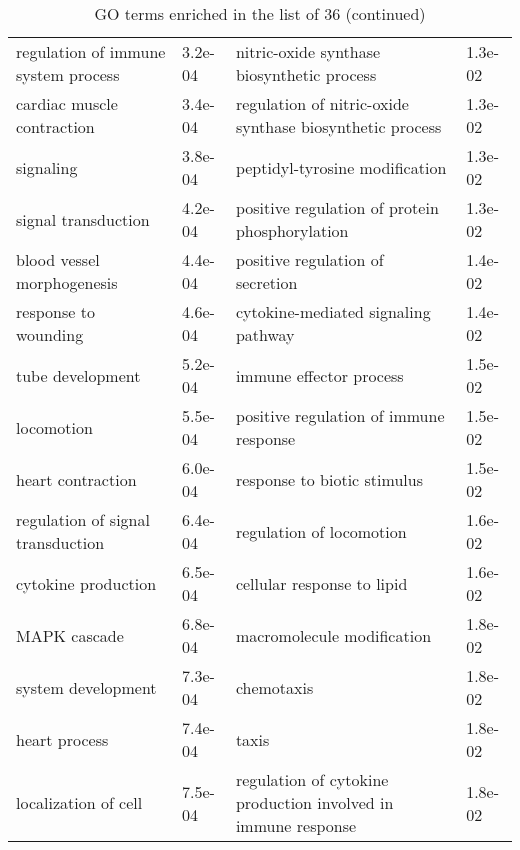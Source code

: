 \documentclass[fleqn,10pt]{SelfArx} %
\begin{document}
\begin{table}[ht]
\begin{tabularx}{\textwidth}{XlXl}
		regulation of immune system process & 3.2e-04 & nitric-oxide synthase biosynthetic process & 1.3e-02 \\ 
		cardiac muscle contraction & 3.4e-04 & regulation of nitric-oxide synthase biosynthetic process & 1.3e-02 \\ 
		signaling & 3.8e-04 & peptidyl-tyrosine modification & 1.3e-02 \\ 
		signal transduction & 4.2e-04 & positive regulation of protein phosphorylation & 1.3e-02 \\ 
		blood vessel morphogenesis & 4.4e-04 & positive regulation of secretion & 1.4e-02 \\ 
		response to wounding & 4.6e-04 & cytokine-mediated signaling pathway & 1.4e-02 \\ 
		tube development & 5.2e-04 & immune effector process & 1.5e-02 \\ 
		locomotion & 5.5e-04 & positive regulation of immune response & 1.5e-02 \\ 
		heart contraction & 6.0e-04 & response to biotic stimulus & 1.5e-02 \\ 
		regulation of signal transduction & 6.4e-04 & regulation of locomotion & 1.6e-02 \\ 
		cytokine production & 6.5e-04 & cellular response to lipid & 1.6e-02 \\ 
		MAPK cascade & 6.8e-04 & macromolecule modification & 1.8e-02 \\ 
		system development & 7.3e-04 & chemotaxis & 1.8e-02 \\
		heart process & 7.4e-04 & taxis & 1.8e-02 \\	
		localization of cell & 7.5e-04 & regulation of cytokine production involved in immune response & 1.8e-02 \\ 
	\end{tabularx}
	\smallskip
	\caption{GO terms enriched in the list of 36 (continued)}
	\label{tab:GO36_1}
\end{table}
			
\end{document}
